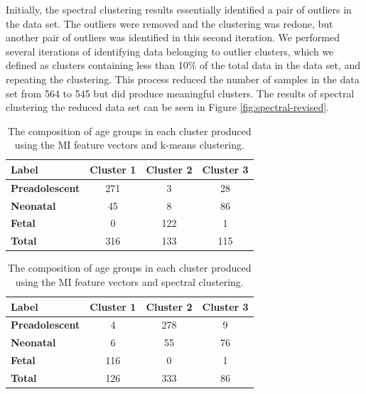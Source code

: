 Initially, the spectral clustering results essentially identified a pair of outliers in the data set. The outliers were removed and the clustering was redone, but another pair of outliers was identified in this second iteration. We performed several iterations of identifying data belonging to outlier clusters, which we defined as clusters containing less than 10\% of the total data in the data set, and repeating the clustering. This process reduced the number of samples in the data set from 564 to 545 but did produce meaningful clusters. The results of spectral clustering the reduced data set can be seen in Figure \ref{fig:spectral-revised}. 

\begin{table}[t!]
\centering
\caption{The composition of age groups in each cluster produced using the MI feature vectors and k-means clustering.}
\label{tab:mocha-mi-kmeans}
\begin{tabular}{|l|c|c|c|}
\hline
\textbf{Label} & \multicolumn{1}{l|}{\textbf{Cluster 1}} & \multicolumn{1}{l|}{\textbf{Cluster 2}} & \multicolumn{1}{l|}{\textbf{Cluster 3}} \\ \hline
\textbf{Preadolescent} & 271 & 3   & 28  \\ \hline
\textbf{Neonatal}      & 45  & 8   & 86  \\ \hline
\textbf{Fetal}         & 0   & 122 & 1   \\ \hline
\textbf{Total}         & 316 & 133 & 115 \\ \hline
\end{tabular}
\end{table}

\begin{table}[t!]
\centering
\caption{The composition of age groups in each cluster produced using the MI feature vectors and spectral clustering.}
\label{tab:mocha-mi-spectral}
\begin{tabular}{|l|c|c|c|}
\hline
\textbf{Label} & \multicolumn{1}{l|}{\textbf{Cluster 1}} & \multicolumn{1}{l|}{\textbf{Cluster 2}} & \multicolumn{1}{l|}{\textbf{Cluster 3}} \\ \hline
\textbf{Preadolescent} &   4 & 278 &  9 \\ \hline
\textbf{Neonatal}      &   6 &  55 & 76 \\ \hline
\textbf{Fetal}         & 116 &   0 &  1 \\ \hline
\textbf{Total}         & 126 & 333 & 86 \\ \hline
\end{tabular}
\end{table}

